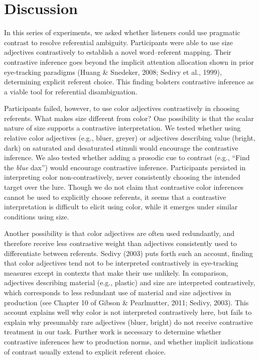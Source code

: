 \documentclass[10pt, letterpaper]{article}
\begin{document}
\section{Discussion}\label{discussion}

In this series of experiments, we asked whether listeners could use
pragmatic contrast to resolve referential ambiguity. Participants were
able to use size adjectives contrastively to establish a novel
word--referent mapping. Their contrastive inference goes beyond the
implicit attention allocation shown in prior eye-tracking paradigms
(Huang \& Snedeker, 2008; Sedivy et al., 1999), determining explicit
referent choice. This finding bolsters contrastive inference as a viable
tool for referential disambiguation.

Participants failed, however, to use color adjectives contrastively in
choosing referents. What makes size different from color? One
possibility is that the scalar nature of size supports a contrastive
interpretation. We tested whether using relative color adjectives (e.g.,
bluer, greyer) or adjectives describing value (bright, dark) on
saturated and desaturated stimuli would encourage the contrastive
inference. We also tested whether adding a prosodic cue to contrast
(e.g., ``Find the \emph{blue} dax'') would encourage contrastive
inference. Participants persisted in interpreting color
non-contrastively, never consistently choosing the intended target over
the lure. Though we do not claim that contrastive color inferences
cannot be used to explicitly choose referents, it seems that a
contrastive interpretation is difficult to elicit using color, while it
emerges under similar conditions using size.

Another possibility is that color adjectives are often used redundantly,
and therefore receive less contrastive weight than adjectives
consistently used to differentiate between referents. Sedivy (2003) puts
forth such an account, finding that color adjectives tend not to be
interpreted contrastively in eye-tracking measures except in contexts
that make their use unlikely. In comparison, adjectives describing
material (e.g., plastic) and size are interpreted contrastively, which
corresponds to less redundant use of material and size adjectives in
production (see Chapter 10 of Gibson \& Pearlmutter, 2011; Sedivy,
2003). This account explains well why color is not interpreted
contrastively here, but fails to explain why presumably rare adjectives
(bluer, bright) do not receive contrastive treatment in our task.
Further work is necessary to determine whether contrastive inferences
hew to production norms, and whether implicit indications of contrast
usually extend to explicit referent choice.
\end{document}
